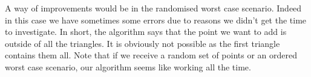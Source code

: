 A way of improvements would be in the randomised worst case scenario. Indeed in this case we have sometimes some errors due to reasons we didn't get the time to investigate. In short, the algorithm says that the point we want to add is outside of all the triangles. It is obviously not possible as the first triangle contains them all. Note that if we receive a random set of points or an ordered worst case scenario, our algorithm seems like working all the time.